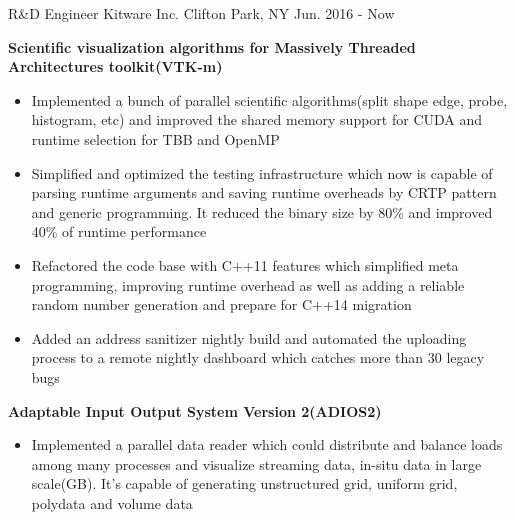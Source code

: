 

\begin{cventries}

  \cventry
    {R\&D Engineer} %
    {Kitware Inc.} %
    {Clifton Park, NY} %
    {Jun. 2016 - Now} %
    {
      \begin{cvitems} %
        \item {\fontsize{10pt}{1em}\bodyfont\bfseries\color{darktext}Scientific visualization algorithms for Massively Threaded Architectures toolkit(VTK-m)}
          \begin{itemize}
              \item {Implemented a bunch of parallel scientific algorithms(split shape edge, probe, histogram, etc) and improved the shared memory support for CUDA and runtime selection for TBB and OpenMP}
              \item {Simplified and optimized the testing infrastructure which now is capable of parsing runtime arguments and saving runtime overheads by CRTP pattern and generic programming. It reduced the binary size by 80\% and improved 40\% of runtime performance}
              \item {Refactored the code base with C++11 features which simplified meta programming, improving runtime overhead as well as adding a reliable random number generation and prepare for C++14 migration}
              \item {Added an address sanitizer nightly build and automated the uploading process to a remote nightly dashboard which catches more than 30 legacy bugs}
          \end{itemize}
        \item {\fontsize{10pt}{1em}\bodyfont\bfseries\color{darktext}Adaptable Input Output System Version 2(ADIOS2)}
          \begin{itemize}
            \item {Implemented a parallel data reader which could distribute and balance loads among many processes and visualize streaming data, in-situ data in large scale(GB). It's capable of generating unstructured grid, uniform grid, polydata and volume data}

\end{itemize}
\end{cvitems}}
\end{cventries}
